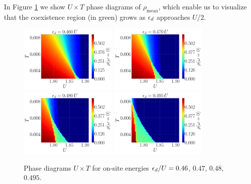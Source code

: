 \documentclass[12pt]{report}
\begin{document}
In Figure \ref{fig:Diagram_Drho_U_T_coex} we show $U \times T$ phase diagrams of $\rho_{\text{mean}}$, which enable us to visualize that the coexistence region (in green) grows as $\epsilon_d$ approaches $U/2$.



\begin{figure}[H]
\includegraphics[width=0.42\textwidth]{fig/dmft/coex_mean-df_0-mu=0.460.png}
\hfill
\includegraphics[width=0.42\textwidth]{fig/dmft/coex_mean-df_0-mu=0.470.png}
\includegraphics[width=0.42\textwidth]{fig/dmft/coex_mean-df_0-mu=0.480.png}
\hfill
\includegraphics[width=0.42\textwidth]{fig/dmft/coex_mean-df_0-mu=0.495.png}
\caption{Phase diagrams $U \times T$ for on-site energies $\epsilon_d/U = 0.46$, $0.47$, $0.48$, $0.495$.}
\label{fig:Diagram_Drho_U_T_coex}
\end{figure}
\end{document}
